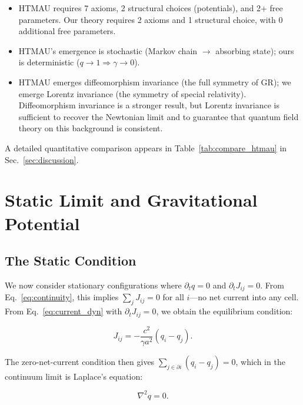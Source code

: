 \documentclass[aps,prd,twocolumn,showpacs,superscriptaddress,preprintnumbers]{revtex4-2}
\begin{document}
\begin{itemize}
    \item HTMAU requires 7 axioms, 2 structural choices (potentials), and 2+ free parameters. Our theory requires 2 axioms and 1 structural choice, with 0 additional free parameters.
    \item HTMAU's emergence is stochastic (Markov chain $\to$ absorbing state); ours is deterministic ($q\to 1 \Rightarrow \gamma\to 0$).
    \item HTMAU emerges diffeomorphism invariance (the full symmetry of GR); we emerge Lorentz invariance (the symmetry of special relativity). Diffeomorphism invariance is a stronger result, but Lorentz invariance is sufficient to recover the Newtonian limit and to guarantee that quantum field theory on this background is consistent.
\end{itemize}

A detailed quantitative comparison appears in Table~\ref{tab:compare_htmau} in Sec.~\ref{sec:discussion}.

\section{Static Limit and Gravitational Potential}
\label{sec:static}

\subsection{The Static Condition}

We now consider stationary configurations where $\partial_t q=0$ and $\partial_t J_{ij}=0$.
From Eq.~\eqref{eq:continuity}, this implies $\sum_j J_{ij}=0$ for all $i$---no net current into any cell.
From Eq.~\eqref{eq:current_dyn} with $\partial_t J_{ij}=0$, we obtain the equilibrium condition:

\begin{equation}
J_{ij} = -\frac{c^2}{\gamma a^2}(q_i - q_j).
\label{eq:J_eq}
\end{equation}

The zero-net-current condition then gives $\sum_{j \in \partial i}(q_i-q_j)=0$, which in the continuum limit is Laplace's equation:

\begin{equation}
\boxed{\nabla^2 q = 0}.
\label{eq:laplace}
\end{equation}
\end{document}
